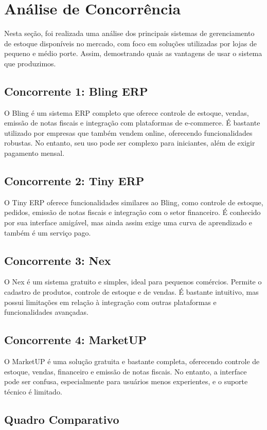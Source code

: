 \documentclass[
	12pt,				%
	openany,			%
	twoside,			%
	a4paper,			%
	english,			%
	brazil				%
	]{abntex2}
\begin{document}
\section{Análise de Concorrência}

Nesta seção, foi realizada uma análise dos principais sistemas de gerenciamento de estoque disponíveis no mercado, com foco em soluções utilizadas por lojas de pequeno e médio porte. Assim, demostrando quais as vantagens de usar o sistema que produzimos.

\subsection{Concorrente 1: Bling ERP}
O Bling é um sistema ERP completo que oferece controle de estoque, vendas, emissão de notas fiscais e integração com plataformas de e-commerce. É bastante utilizado por empresas que também vendem online, oferecendo funcionalidades robustas. No entanto, seu uso pode ser complexo para iniciantes, além de exigir pagamento mensal.

\subsection{Concorrente 2: Tiny ERP}
O Tiny ERP oferece funcionalidades similares ao Bling, como controle de estoque, pedidos, emissão de notas fiscais e integração com o setor financeiro. É conhecido por sua interface amigável, mas ainda assim exige uma curva de aprendizado e também é um serviço pago.

\subsection{Concorrente 3: Nex}
O Nex é um sistema gratuito e simples, ideal para pequenos comércios. Permite o cadastro de produtos, controle de estoque e de vendas. É bastante intuitivo, mas possui limitações em relação à integração com outras plataformas e funcionalidades avançadas.

\subsection{Concorrente 4: MarketUP}
O MarketUP é uma solução gratuita e bastante completa, oferecendo controle de estoque, vendas, financeiro e emissão de notas fiscais. No entanto, a interface pode ser confusa, especialmente para usuários menos experientes, e o suporte técnico é limitado.

\subsection{Quadro Comparativo}
\end{document}
